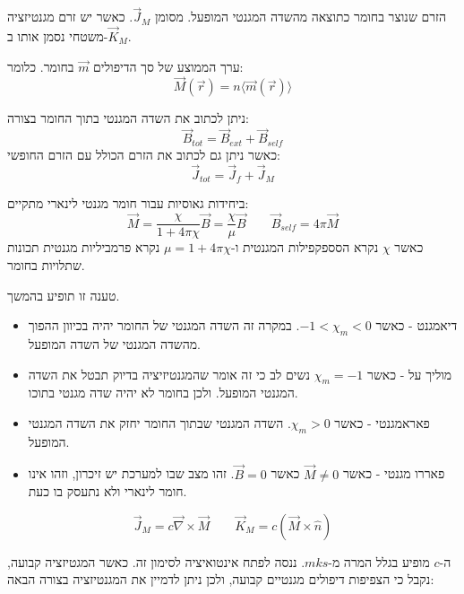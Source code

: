 \documentclass{tstextbook}
\begin{document}
\begin{definition}
הזרם שנוצר בחומר כתוצאה מהשדה המגנטי המופעל. מסומן \(\vec{J}_{M}\). כאשר יש זרם מגנטיזציה משטחי נסמן אותו ב-\(\vec{K}_{M}\).

\end{definition}
\begin{definition}[מגנטיזציה]
ערך הממוצע של סך הדיפולים \(\vec{m}\) בחומר. כלומר:
$$\vec{M}(\vec{r})=n\langle\vec{m}(\vec{r})\rangle$$

\end{definition}
\begin{proposition}
ניתן לכתוב את השדה המגנטי בתוך החומר בצורה:
$$\vec{B}_{tot}=\vec{B}_{ext}+\vec{B}_{self}$$
כאשר ניתן גם לכתוב את הזרם הכולל עם הזרם החופשי:
$$\vec{J}_{t o t}=\vec{J}_{f}+\vec{J}_{M}$$

\end{proposition}
\begin{proposition}
ביחידות גאוסיות עבור חומר מגנטי לינארי מתקיים:
$$\vec{M}=\frac{\chi}{1+4\pi\chi}\vec{B}=\frac{\chi}{\mu}\vec{B} \qquad \vec{B}_{self}=4\pi \vec{M}$$
כאשר \(\chi\) נקרא הסספקפילות המגנטית ו-\({\mu}=1+4\pi\chi\) נקרא פרמביליות מגנטית תכונות שתלויות בחומר.

\end{proposition}
טענה זו תופיע בהמשך.

\begin{definition}
  \begin{itemize}
    \item דיאמגנט - כאשר \(-1<\chi_{m}<0\). במקרה זה השדה המגנטי של החומר יהיה בכיוון ההפוך מהשדה המגנטי של השדה המופעל.
    \item מוליך על - כאשר \(\chi_{m}=-1\) נשים לב כי זה אומר שהמגנטיזיציה בדיוק תבטל את השדה המגנטי המופעל. ולכן בחומר לא יהיה שדה מגנטי בתוכו.
    \item פאראמגנטי - כאשר \(\chi_{m}> 0\). השדה המגנטי שבתוך החומר יחזק את השדה המגנטי המופעל.
    \item פאררו מגנטי - כאשר \(\vec{M}\neq 0\) כאשר \(\vec{B} =0\). זהו מצב שבו למערכת יש זיכרון, וזהו אינו חומר לינארי ולא נתעסק בו כעת.
  \end{itemize}
\end{definition}
\begin{symbolize}
$${{\vec{J}_{M}=c\vec{\nabla}\times\vec{M}}}\qquad {{\vec{K}_{M}=c\left(\vec{M}\times\hat{n}\right)}}$$

\end{symbolize}
ה-\(c\) מופיע בגלל המרה מ-\(mks\). ננסה לפתח אינטואיציה לסימון זה. כאשר המגטיזציה קבועה, נקבל כי הצפיפות דיפולים מגנטיים קבועה, ולכן ניתן לדמיין את המגנטיזציה בצורה הבאה:
\end{document}
